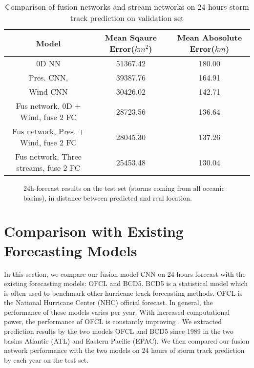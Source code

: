 \begin{table}[]
	\centering
	\caption{Comparison of fusion networks and stream networks on 24 hours storm track prediction on validation set}
	\label{table:fus_compare_}
	\begin{tabular}{|c|c|c|}
		\hline
		Model & Mean Sqaure Error($km^2$) & Mean Abosolute Error($km$) \\ \hline
		0D NN & 51367.42 & 180.00 \\ \hline
		Pres. CNN, & 39387.76 & 164.91 \\ \hline
		Wind CNN & 30426.02 & 142.71 \\ \hline
		Fus network, 0D + Wind, fuse 2 FC  & 28723.56 & 136.64 \\ \hline
		Fus network, Pres. + Wind, fuse 2 FC & 28045.30 & 137.26 \\ \hline
		Fus network, Three streams, fuse 2 FC & 25453.48 & 130.04 \\ \hline
		
		
	\end{tabular}
\end{table}

\begin{figure}
	\begin{center}
		\hsize {}
	\end{center}
	\caption{24h-forecast results on the test set (storms coming from all oceanic basins), in distance between predicted and real location.}
	\label{fig:boxplots}
\end{figure}

\section{Comparison with Existing Forecasting Models}
In this section, we compare our fusion model CNN on 24 hours forecast with the existing forecasting models: OFCL and BCD5. BCD5 is a statistical model which is often used to benchmark other hurricane track forecasting methods. OFCL is the National Hurricane Center (NHC) official forecast. In general, the performance of these models varies per year. With increased computational power, the performance of OFCL is constantly improving \cite{hurricane_models}. We extracted prediction results by the two models OFCL and BCD5 since 1989 in the two basins Atlantic (ATL) and Eastern Pacific (EPAC). We then compared our fusion network performance with the two models on 24 hours of storm track prediction by each year on the test set.
